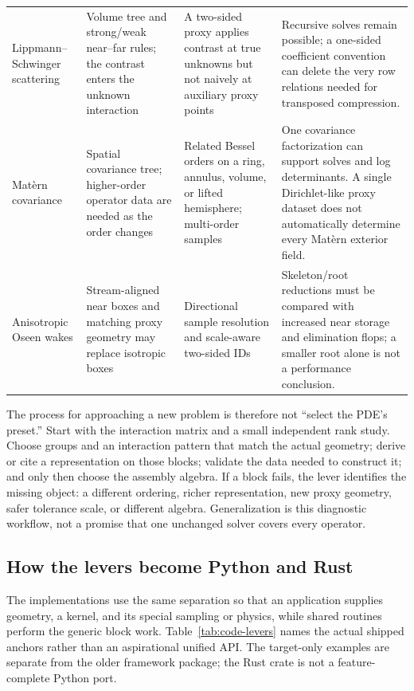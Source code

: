 \documentclass[11pt,a4paper]{article}
\begin{document}
{\begin{longtable}{@{}>{\raggedright\arraybackslash}p{}>{\raggedright\arraybackslash}p{}>{\raggedright\arraybackslash}p{}>{\raggedright\arraybackslash}p{}@{}}
Lippmann--Schwinger scattering & Volume tree and strong/weak near--far rules; the contrast enters the unknown interaction & A two-sided proxy applies contrast at true unknowns but not naively at auxiliary proxy points & Recursive solves remain possible; a one-sided coefficient convention can delete the very row relations needed for transposed compression.\\
Mat\`ern covariance & Spatial covariance tree; higher-order operator data are needed as the order changes & Related Bessel orders on a ring, annulus, volume, or lifted hemisphere; multi-order samples & One covariance factorization can support solves and log determinants. A single Dirichlet-like proxy dataset does not automatically determine every Mat\`ern exterior field.\\
Anisotropic Oseen wakes & Stream-aligned near boxes and matching proxy geometry may replace isotropic boxes & Directional sample resolution and scale-aware two-sided IDs & Skeleton/root reductions must be compared with increased near storage and elimination flops; a smaller root alone is not a performance conclusion.\\
\bottomrule
\end{longtable}}

The process for approaching a new problem is therefore not ``select the PDE's preset.'' Start with the interaction matrix and a small independent rank study. Choose groups and an interaction pattern that match the actual geometry; derive or cite a representation on those blocks; validate the data needed to construct it; and only then choose the assembly algebra. If a block fails, the lever identifies the missing object: a different ordering, richer representation, new proxy geometry, safer tolerance scale, or different algebra. Generalization is this diagnostic workflow, not a promise that one unchanged solver covers every operator.

\subsection{How the levers become Python and Rust}
\label{sec:code-levers}
The implementations use the same separation so that an application supplies geometry, a kernel, and its special sampling or physics, while shared routines perform the generic block work. Table~\ref{tab:code-levers} names the actual shipped anchors rather than an aspirational unified API. The target-only examples are separate from the older framework package; the Rust crate is not a feature-complete Python port.
\end{document}
